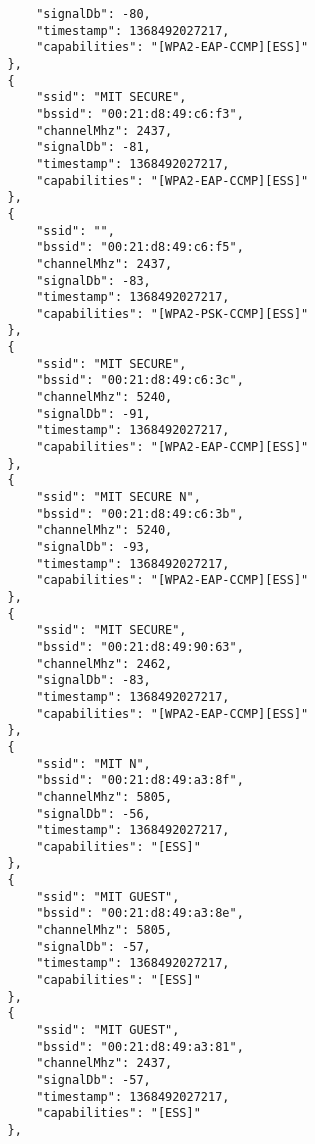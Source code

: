 \begin{verbatim}
                    "signalDb": -80,
                    "timestamp": 1368492027217,
                    "capabilities": "[WPA2-EAP-CCMP][ESS]"
                },
                {
                    "ssid": "MIT SECURE",
                    "bssid": "00:21:d8:49:c6:f3",
                    "channelMhz": 2437,
                    "signalDb": -81,
                    "timestamp": 1368492027217,
                    "capabilities": "[WPA2-EAP-CCMP][ESS]"
                },
                {
                    "ssid": "",
                    "bssid": "00:21:d8:49:c6:f5",
                    "channelMhz": 2437,
                    "signalDb": -83,
                    "timestamp": 1368492027217,
                    "capabilities": "[WPA2-PSK-CCMP][ESS]"
                },
                {
                    "ssid": "MIT SECURE",
                    "bssid": "00:21:d8:49:c6:3c",
                    "channelMhz": 5240,
                    "signalDb": -91,
                    "timestamp": 1368492027217,
                    "capabilities": "[WPA2-EAP-CCMP][ESS]"
                },
                {
                    "ssid": "MIT SECURE N",
                    "bssid": "00:21:d8:49:c6:3b",
                    "channelMhz": 5240,
                    "signalDb": -93,
                    "timestamp": 1368492027217,
                    "capabilities": "[WPA2-EAP-CCMP][ESS]"
                },
                {
                    "ssid": "MIT SECURE",
                    "bssid": "00:21:d8:49:90:63",
                    "channelMhz": 2462,
                    "signalDb": -83,
                    "timestamp": 1368492027217,
                    "capabilities": "[WPA2-EAP-CCMP][ESS]"
                },
                {
                    "ssid": "MIT N",
                    "bssid": "00:21:d8:49:a3:8f",
                    "channelMhz": 5805,
                    "signalDb": -56,
                    "timestamp": 1368492027217,
                    "capabilities": "[ESS]"
                },
                {
                    "ssid": "MIT GUEST",
                    "bssid": "00:21:d8:49:a3:8e",
                    "channelMhz": 5805,
                    "signalDb": -57,
                    "timestamp": 1368492027217,
                    "capabilities": "[ESS]"
                },
                {
                    "ssid": "MIT GUEST",
                    "bssid": "00:21:d8:49:a3:81",
                    "channelMhz": 2437,
                    "signalDb": -57,
                    "timestamp": 1368492027217,
                    "capabilities": "[ESS]"
                },

\end{verbatim}
